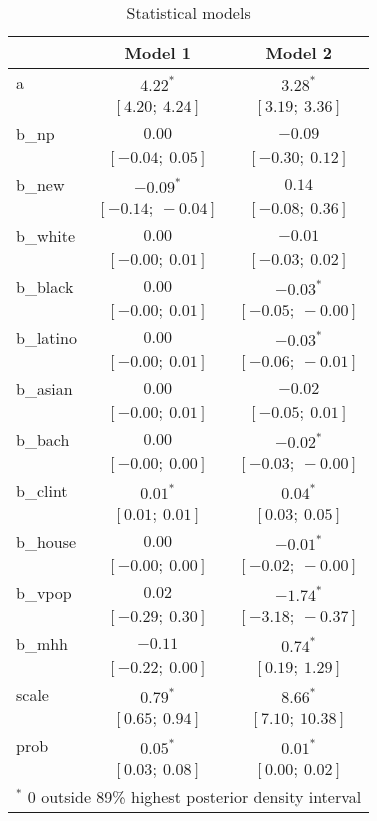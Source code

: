 
\begin{table}
\begin{center}
\begin{tabular}{l c c }
\hline
 & Model 1 & Model 2 \\
\hline
a         & $4.22^{*}$        & $3.28^{*}$        \\
          & $[4.20;\ 4.24]$   & $[3.19;\ 3.36]$   \\
b\_np     & $0.00$            & $-0.09$           \\
          & $[-0.04;\ 0.05]$  & $[-0.30;\ 0.12]$  \\
b\_new    & $-0.09^{*}$       & $0.14$            \\
          & $[-0.14;\ -0.04]$ & $[-0.08;\ 0.36]$  \\
b\_white  & $0.00$            & $-0.01$           \\
          & $[-0.00;\ 0.01]$  & $[-0.03;\ 0.02]$  \\
b\_black  & $0.00$            & $-0.03^{*}$       \\
          & $[-0.00;\ 0.01]$  & $[-0.05;\ -0.00]$ \\
b\_latino & $0.00$            & $-0.03^{*}$       \\
          & $[-0.00;\ 0.01]$  & $[-0.06;\ -0.01]$ \\
b\_asian  & $0.00$            & $-0.02$           \\
          & $[-0.00;\ 0.01]$  & $[-0.05;\ 0.01]$  \\
b\_bach   & $0.00$            & $-0.02^{*}$       \\
          & $[-0.00;\ 0.00]$  & $[-0.03;\ -0.00]$ \\
b\_clint  & $0.01^{*}$        & $0.04^{*}$        \\
          & $[0.01;\ 0.01]$   & $[0.03;\ 0.05]$   \\
b\_house  & $0.00$            & $-0.01^{*}$       \\
          & $[-0.00;\ 0.00]$  & $[-0.02;\ -0.00]$ \\
b\_vpop   & $0.02$            & $-1.74^{*}$       \\
          & $[-0.29;\ 0.30]$  & $[-3.18;\ -0.37]$ \\
b\_mhh    & $-0.11$           & $0.74^{*}$        \\
          & $[-0.22;\ 0.00]$  & $[0.19;\ 1.29]$   \\
scale     & $0.79^{*}$        & $8.66^{*}$        \\
          & $[0.65;\ 0.94]$   & $[7.10;\ 10.38]$  \\
prob      & $0.05^{*}$        & $0.01^{*}$        \\
          & $[0.03;\ 0.08]$   & $[0.00;\ 0.02]$   \\
\hline
\multicolumn{3}{l}{\scriptsize{$^*$ 0 outside 89\% highest posterior density interval}}
\end{tabular}
\caption{Statistical models}
\label{table:coefficients}
\end{center}
\end{table}
